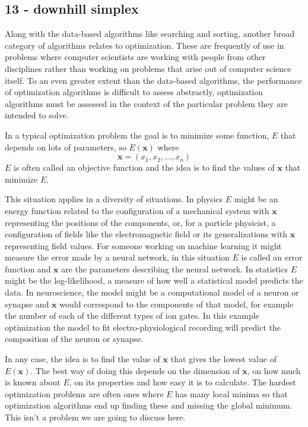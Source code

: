 \documentclass[11pt,a4paper]{scrartcl}
\begin{document}
\subsection*{13 - downhill simplex}

Along with the data-based algorithms like searching and sorting,
another broad category of algorithms relates to optimization. These
are frequently of use in problems where computer scientists are
working with people from other disciplines rather than working on
problems that arise out of computer science itself. To an even greater
extent than the data-based algorithms, the performance of optimization
algorithms is difficult to assess abstractly, optimization algorithms
must be assessed in the context of the particular problem they are
intended to solve.

In a typical optimization problem the goal is to minimize some
function, $E$ that depends on lots of parameters, so $E(\mathbf{x})$ where
\begin{equation}
\mathbf{x}=(x_1,x_2,\ldots,x_n)
\end{equation}
$E$ is often called an objective function and the idea is to find the values of $\mathbf{x}$ that minimize $E$.

This situation applies in a diversity of situations. In physics $E$
might be an energy function related to the configuration of a
mechanical system with $\mathbf{x}$ representing the positions of the
components, or, for a particle physicist, a configuration of fields
like the electromagnetic field or its generalizations with
$\mathbf{x}$ representing field values. For someone working on machine
learning it might measure the error made by a neural network, in this
situation $E$ is called an error function and $\mathbf{x}$ are the
parameters describing the neural network. In statistics $E$ might be
the log-likelihood, a measure of how well a statistical model predicts
the data. In neuroscience, the model might be a computational model of
a neuron or synapse and $\mathbf{x}$ would correspond to the
components of that model, for example the number of each of the
different types of ion gates. In this example optimization the model
to fit electro-physiological recording will predict the composition of
the neuron or synapse.

In any case, the idea is to find the value of $\mathbf{x}$ that gives
the lowest value of $E(\mathbf{x})$. The best way of doing this
depends on the dimension of $\mathbf{x}$, on how much is known about
$E$, on its properties and how easy it is to calculate. The hardest
optimization problems are often ones where $E$ has many local minima
so that optimization algorithms end up finding these and missing the
global minimum. This isn't a problem we are going to discuss here.
\end{document}
